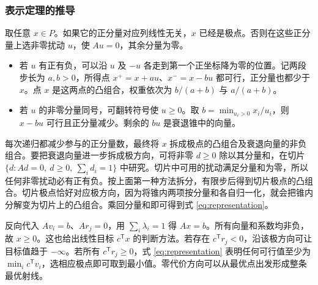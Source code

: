 \documentclass[UTF8,fontset=none,zihao=-4,a4paper]{ctexart}
\newcommand{\transpose}{^{\mathsf T}}
\begin{document}
\subsubsection*{表示定理的推导}
取任意 $x\in P$。如果它的正分量对应列线性无关，$x$ 已经是极点。否则在这些正分量上选非零扰动 $u$，使 $Au=0$，其余分量为零。
\begin{itemize}
\item 若 $u$ 有正有负，可以沿 $u$ 及 $-u$ 各走到第一个正坐标降为零的位置。记两段步长为 $a,b>0$，所得点 $x^+=x+au$、$x^-=x-bu$ 都可行，正分量也都少于 $x$。点 $x$ 是这两点的凸组合，权重依次为 $b/(a+b)$ 与 $a/(a+b)$。
\item 若 $u$ 的非零分量同号，可翻转符号使 $u\ge0$。取 $b=\min_{u_i>0}x_i/u_i$，则 $x-bu$ 可行且正分量减少。剩余的 $bu$ 是衰退锥中的向量。
\end{itemize}
每次递归都减少参与的正分量数，最终将 $x$ 拆成极点的凸组合及衰退向量的非负组合。要把衰退向量进一步拆成极方向，可将非零 $d\ge0$ 除以其分量和，在切片 $\{d:Ad=0,\ d\ge0,\ \sum_i d_i=1\}$ 中研究。切片中可用的扰动满足分量和为零，所以任何非零扰动必有正有负。按上面第一种方法拆分，有限步后得到切片极点的凸组合。切片极点恰好对应极方向，因为将锥内两项按分量和各自归一化，就会把锥内分解变为切片上的凸组合。乘回分量和即可得到式 \eqref{eq:representation}。

反向代入 $Av_i=b$、$Ar_j=0$，用 $\sum_i\lambda_i=1$ 得 $Ax=b$。所有向量和系数均非负，故 $x\ge0$。这也给出线性目标 $c\transpose x$ 的判断方法。若存在 $c\transpose r_j<0$，沿该极方向可让目标值趋于 $-\infty$。若所有 $c\transpose r_j\ge0$，式 \eqref{eq:representation} 表明任何可行值至少为 $\min_i c\transpose v_i$，选相应极点即可取到最小值。零代价方向可以从最优点出发形成整条最优射线。
\end{document}
